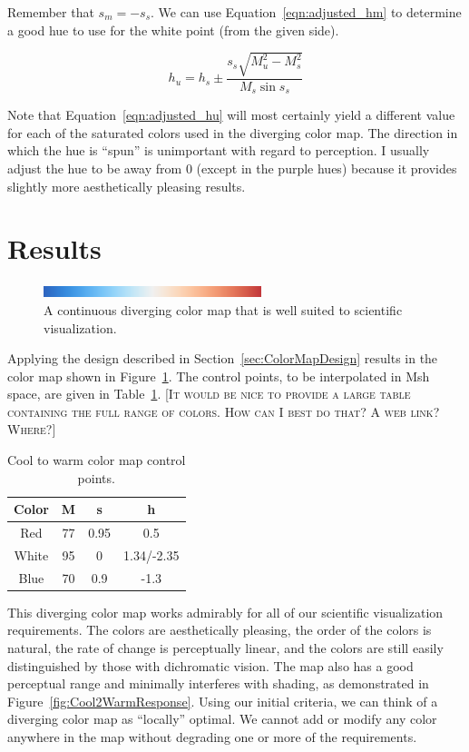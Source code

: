 \documentclass{vgtc}                          %
\newcommand{\sticky}[1]{\textsc{[#1]}}
\newcommand{\Msh}{Msh\xspace}
\begin{document}
Remember that $s_m=-s_s$.  We can use Equation~\ref{eqn:adjusted_hm} to
determine a good hue to use for the white point (from the given side).

\begin{equation}
  h_u = h_s \pm \frac{s_s \sqrt{M_u^2 - M_s^2}}{M_s \sin s_s}
  \label{eqn:adjusted_hu}
\end{equation}

Note that Equation~\ref{eqn:adjusted_hu} will most certainly yield a
different value for each of the saturated colors used in the diverging
color map.  The direction in which the hue is ``spun'' is unimportant with
regard to perception.  I usually adjust the hue to be away from 0 (except
in the purple hues) because it provides slightly more aesthetically
pleasing results.


\section{Results}
\label{sec:Results}

\begin{figure}
  \centering
  \includegraphics[width=2.5in]{images/Cool2WarmBar}
  \caption{A continuous diverging color map that is well suited to scientific
    visualization.}
  \label{fig:Cool2WarmBar}
\end{figure}

Applying the design described in Section~\ref{sec:ColorMapDesign} results
in the color map shown in Figure~\ref{fig:Cool2WarmBar}.  The control
points, to be interpolated in \Msh space, are given in
Table~\ref{table:Cool2Warm}.  \sticky{It would be nice to provide a large
  table containing the full range of colors.  How can I best do that?  A
  web link?  Where?}

\begin{table}
  \centering
  \caption{Cool to warm color map control points.}
  \begin{tabular}{c@{\qquad}ccc}
    Color & M & s & h \\
    \hline
    Red & 77 & 0.95 & 0.5 \\
    White & 95 & 0 & 1.34/-2.35 \\
    Blue & 70 & 0.9 & -1.3
  \end{tabular}
  \label{table:Cool2Warm}
\end{table}

This diverging color map works admirably for all of our scientific
visualization requirements.  The colors are aesthetically pleasing, the
order of the colors is natural, the rate of change is perceptually linear,
and the colors are still easily distinguished by those with dichromatic
vision.  The map also has a good perceptual range and minimally interferes
with shading, as demonstrated in Figure~\ref{fig:Cool2WarmResponse}.
Using our initial criteria, we can think of a diverging color map as
``locally'' optimal.  We cannot add or modify any color anywhere in the map
without degrading one or more of the requirements.
\end{document}
